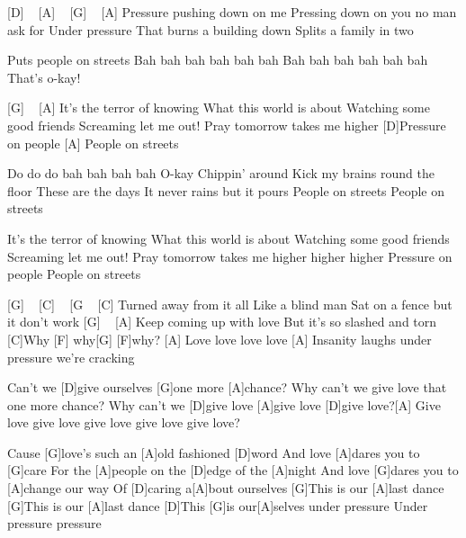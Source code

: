 [D] ~ [A] ~ [G] ~ [A]
Pressure pushing down on me
Pressing down on you no man ask for
Under pressure
That burns a building down
Splits a family in two

Puts people on streets
Bah bah bah bah bah bah
Bah bah bah bah bah bah
That's o-kay!

[G] ~ [A]
It's the terror of knowing
What this world is about
Watching some good friends
Screaming let me out!
Pray tomorrow takes me higher
[D]Pressure on people
[A]
People on streets

Do do do bah bah bah bah
O-kay
Chippin' around
Kick my brains round the floor
These are the days
It never rains but it pours
People on streets
People on streets

It's the terror of knowing
What this world is about
Watching some good friends
Screaming let me out!
Pray tomorrow takes me higher higher higher
Pressure on people
People on streets

[G] ~ [C] ~ [G ~ [C]
Turned away from it all
Like a blind man
Sat on a fence but it don't work
[G] ~ [A]
Keep coming up with love
But it's so slashed and torn
[C]Why [F] why[G]  [F]why?
[A]
Love love love love
[A]
Insanity laughs under pressure we're cracking

Can't we [D]give ourselves [G]one more [A]chance?
Why can't we give love that one more chance?
Why can't we [D]give love [A]give love [D]give love?[A]
Give love give love give love give love give love?

Cause [G]love's such an [A]old fashioned [D]word
And love [A]dares you to [G]care
For the [A]people on the [D]edge of the [A]night
And love [G]dares you to [A]change our way
Of [D]caring a[A]bout ourselves
[G]This is our [A]last dance
[G]This is our [A]last dance
[D]This [G]is our[A]selves under pressure
Under pressure pressure 